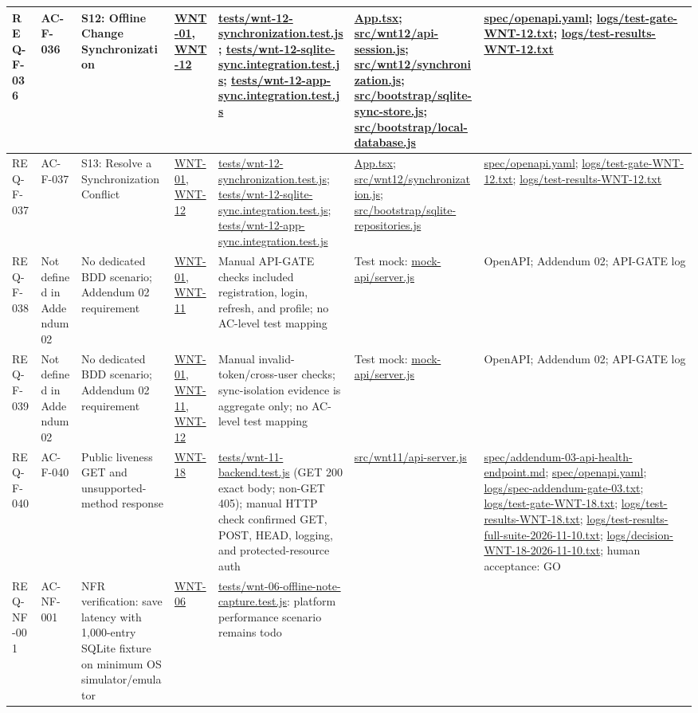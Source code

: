 \documentclass[10pt,a4paper]{article}
\renewcommand{\texttt}[1]{\url{#1}}
\begin{document}
\begin{longtable}{|L{2.5cm}|L{2.6cm}|L{4.4cm}|L{3.3cm}|L{3.3cm}|L{3.3cm}|L{3.3cm}|}
REQ-F-036 & AC-F-036 & S12: Offline Change Synchronization & \texttt{WNT-01}, \texttt{WNT-12} & \texttt{tests/wnt-12-synchronization.test.js}; \texttt{tests/wnt-12-sqlite-sync.integration.test.js}; \texttt{tests/wnt-12-app-sync.integration.test.js} & \texttt{App.tsx}; \texttt{src/wnt12/api-session.js}; \texttt{src/wnt12/synchronization.js}; \texttt{src/bootstrap/sqlite-sync-store.js}; \texttt{src/bootstrap/local-database.js} & \texttt{spec/openapi.yaml}; \texttt{logs/test-gate-WNT-12.txt}; \texttt{logs/test-results-WNT-12.txt} \\ \hline
REQ-F-037 & AC-F-037 & S13: Resolve a Synchronization Conflict & \texttt{WNT-01}, \texttt{WNT-12} & \texttt{tests/wnt-12-synchronization.test.js}; \texttt{tests/wnt-12-sqlite-sync.integration.test.js}; \texttt{tests/wnt-12-app-sync.integration.test.js} & \texttt{App.tsx}; \texttt{src/wnt12/synchronization.js}; \texttt{src/bootstrap/sqlite-repositories.js} & \texttt{spec/openapi.yaml}; \texttt{logs/test-gate-WNT-12.txt}; \texttt{logs/test-results-WNT-12.txt} \\ \hline
REQ-F-038 & Not defined in Addendum 02 & No dedicated BDD scenario; Addendum 02 requirement & \texttt{WNT-01}, \texttt{WNT-11} & Manual API-GATE checks included registration, login, refresh, and profile; no AC-level test mapping & Test mock: \texttt{mock-api/server.js} & OpenAPI; Addendum 02; API-GATE log \\ \hline
REQ-F-039 & Not defined in Addendum 02 & No dedicated BDD scenario; Addendum 02 requirement & \texttt{WNT-01}, \texttt{WNT-11}, \texttt{WNT-12} & Manual invalid-token/cross-user checks; sync-isolation evidence is aggregate only; no AC-level test mapping & Test mock: \texttt{mock-api/server.js} & OpenAPI; Addendum 02; API-GATE log \\ \hline
REQ-F-040 & AC-F-040 & Public liveness GET and unsupported-method response & \texttt{WNT-18} & \texttt{tests/wnt-11-backend.test.js} (GET 200 exact body; non-GET 405); manual HTTP check confirmed GET, POST, HEAD, logging, and protected-resource auth & \texttt{src/wnt11/api-server.js} & \texttt{spec/addendum-03-api-health-endpoint.md}; \texttt{spec/openapi.yaml}; \texttt{logs/spec-addendum-gate-03.txt}; \texttt{logs/test-gate-WNT-18.txt}; \texttt{logs/test-results-WNT-18.txt}; \texttt{logs/test-results-full-suite-2026-11-10.txt}; \texttt{logs/decision-WNT-18-2026-11-10.txt}; human acceptance: GO \\ \hline
REQ-NF-001 & AC-NF-001 & NFR verification: save latency with 1,000-entry SQLite fixture on minimum OS simulator/emulator & \texttt{WNT-06} & \texttt{tests/wnt-06-offline-note-capture.test.js}: platform performance scenario remains todo & & \\ \hline

\end{longtable}
\end{document}
